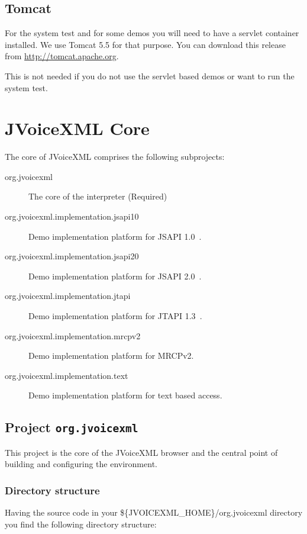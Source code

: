 \documentclass[11pt,a4paper]{article}
\begin{document}
\subsection{Tomcat}
\label{sec:tomcat}

For the system test and for some demos you will need to have a servlet
container installed. We use Tomcat 5.5 for that purpose. You can download this
release from \url{http://tomcat.apache.org}.

This is not needed if you do not use the servlet based demos or want to run the
system test.

\section{JVoiceXML Core}

The core of JVoiceXML comprises the following subprojects:

\begin{description}
\item[org.jvoicexml] The core of the interpreter (Required)
\item[org.jvoicexml.implementation.jsapi10] Demo implementation platform for
JSAPI 1.0~\cite{sun:jsapi}.
\item[org.jvoicexml.implementation.jsapi20] Demo implementation platform for
JSAPI 2.0~\cite{jcp:jsr113}.
\item[org.jvoicexml.implementation.jtapi] Demo implementation platform for
JTAPI 1.3~\cite{sun:jtapi}.
\item[org.jvoicexml.implementation.mrcpv2] Demo implementation platform for
MRCPv2.
\item[org.jvoicexml.implementation.text] Demo implementation platform for
text based access.
\end{description}

\subsection{Project \lstinline{org.jvoicexml}}

This project is the core of the JVoiceXML browser and the central point of
building and configuring the environment.

\subsubsection{Directory structure}
\label{sec:directory-structure}

Having the source code in your \$\{JVOICEXML\_HOME\}/org.jvoicexml
directory you find the following directory structure:
\end{document}

